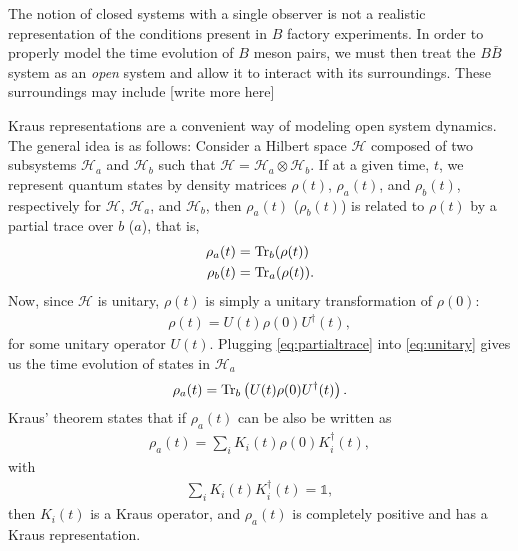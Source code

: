 The notion of closed systems with a single observer is not a realistic representation of the conditions present in $B$ factory experiments. In order to properly model the time evolution of $B$ meson pairs, we must then treat the $B\bar{B}$ system as an \textit{open} system and allow it to interact with its surroundings. These surroundings may include [write more here]

Kraus representations \cite{Kraus} are a convenient way of modeling open system dynamics. The general idea is as follows: Consider a Hilbert space $\mathcal{H}$ composed of two subsystems $\mathcal{H}_a$ and $\mathcal{H}_b$ such that $\mathcal{H}=\mathcal{H}_a\otimes \mathcal{H}_b$. If at a given time, $t$, we represent quantum states by density matrices $\rho(t)$, $\rho_a(t)$, and $\rho_b(t)$, respectively for $\mathcal{H}$, $\mathcal{H}_a$, and $\mathcal{H}_b$, then $\rho_{a}(t)$ ($\rho_b(t)$) is related to $\rho(t)$ by a partial trace over $b$ ($a$), that is,
\begin{align}
\rho_a(t) &= \Tr_b(\rho(t))\nonumber \\
\label{eq:partialtrace}
\rho_b(t) &= \Tr_a(\rho(t)).
\end{align}
Now, since $\mathcal{H}$ is unitary, $\rho(t)$ is simply a unitary transformation of $\rho(0)$:
\begin{align}
\label{eq:unitary}
\rho(t) = U(t)\rho(0)U^\dagger(t),
\end{align} 
for some unitary operator $U(t)$. Plugging \ref{eq:partialtrace} into \ref{eq:unitary} gives us the time evolution of states in $\mathcal{H}_a$
\begin{align}
\rho_a(t) = \Tr_b\left(U(t)\rho(0)U^\dagger(t)\right).
\end{align}
Kraus' theorem states that if $\rho_a(t)$ can be also be written as
\begin{align}
\rho_a(t) = \sum_iK_i(t)\rho(0)K_i^\dagger(t),
\end{align}
with
\begin{align}
\sum_iK_i(t)K_i^\dagger(t)=\mathds{1},
\end{align}
then $K_i(t)$ is a Kraus operator, and $\rho_a(t)$ is completely positive and has a Kraus representation.

